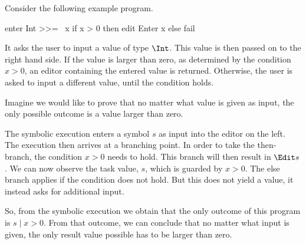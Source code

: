 \begin{example}
Consider the following example program.

\begin{TASK}
  enter Int >>= \ x if x > 0 then edit Enter x else fail
\end{TASK}

It asks the user to input a value of type $\Int$.
This value is then passed on to the right hand side.
If the value is larger than zero, as determined by the condition $x>0$,
an editor containing the entered value is returned.
Otherwise, the user is asked to input a different value, until the condition holds.

Imagine we would like to prove that no matter what value is given as input,
the only possible outcome is a value larger than zero.

The symbolic execution enters a symbol $s$ as input into the editor on the left.
The execution then arrives at a branching point.
In order to take the then-branch, the condition $x>0$ needs to hold.
This branch will then result in $\Edit s$.
We can now observe the task value, $s$, which is guarded by $x>0$.
The else branch applies if the condition does not hold.
But this does not yield a value, it instead asks for additional input.

So, from the symbolic execution we obtain that the only outcome of this program is $s \mid x>0$.
From that outcome, we can conclude that no matter what input is given, the only result value possible has to be larger than zero.
\end{example}
